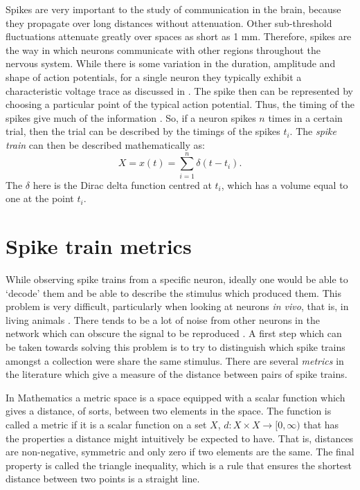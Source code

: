 Spikes are very important to the study of communication in the brain, because they propagate over long distances without 
attenuation. Other sub-threshold fluctuations attenuate greatly over spaces as short as 1 mm. Therefore, spikes are the way in which neurons communicate with other regions 
throughout the nervous system.  While there is some variation in 
the duration, amplitude and shape of action potentials, for a single neuron they typically exhibit a characteristic voltage trace as discussed in \citep{Lewicki1998a}. The spike then can be represented by choosing a particular point of the typical action potential. Thus, the timing of the spikes give much of the information \citep{BiPoo1998a,Bair1999a}.  So, 
if a neuron spikes $n$ times in a certain trial, then the trial can be 
described by the timings of the spikes $t_i$.  The 
\emph{spike train} can then be described mathematically as:
\begin{equation}
X = x(t) = \sum_{i=1}^n \delta(t-t_i).
\end{equation}
The $\delta$ here is the Dirac delta function centred at $t_i$, which has a volume equal to 
one at the point $t_i$.

\section{Spike train metrics}

While observing spike trains from a specific neuron, ideally one would be able to 
\lq{}decode\rq{} them and be able to describe the stimulus which produced them.  
This problem is very difficult, particularly when looking at neurons \emph{in vivo}, that is, in living animals \citep{AverbeckEtAl2006a}. There tends to be a lot of noise from other neurons in the network which can obscure the signal to be reproduced \citep{Hopfield1982a}.  A first step which can be taken towards solving this problem is to try to distinguish which spike trains amongst a collection were share 
the same stimulus.  There are several \emph{metrics} in the 
literature which give a measure of the distance between pairs of spike trains.  

In Mathematics a metric space is a space equipped with a scalar function which gives a  
distance, of sorts, between two elements in the space.  The function is called a metric if it is a scalar function on a set 
$X$, $d: X\times X \rightarrow [0,\infty )$ that has the properties a distance might intuitively be expected to have. That is, distances are non-negative, 
symmetric and only zero if two elements are the same. The final property is called the triangle inequality, which is a rule that ensures the shortest 
distance between two points is a straight line.

